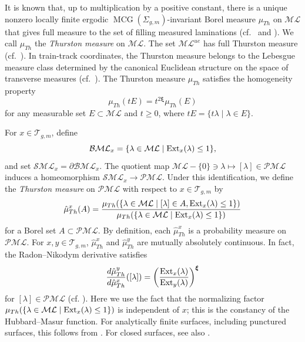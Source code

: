 \documentclass[dvipdfmx]{amsart}
\theoremstyle{remark}
\newcommand{\ext}{{\rm Ext}}
\newcommand{\teich}{\mathcal{T}}
\newcommand{\mcg}{\operatorname{MCG}}
\newcommand{\ThursM}{\mu_{Th}}
\newcommand{\PThursM}{\hat{\mu}_{Th}}
\newcommand{\convgenus}{{\boldsymbol \xi}}
\newcommand{\ml}{\mathcal{ML}}
\newcommand{\pml}{\mathcal{PML}}
\begin{document}
It is known that, up to multiplication by a positive constant, there is a unique nonzero locally finite ergodic $\mcg(\Sigma_{g,m})$-invariant Borel measure $\ThursM$ on $\ml$ that gives full measure to the set of filling measured laminations (cf.\ \cite{Masur1985} and \cite{LindenstraussMirzakhani2008}). We call $\ThursM$ the \emph{Thurston measure} on $\ml$.
The set $\ml^{ue}$ has full Thurston measure (cf.\ \cite{Masur1982}).
In train-track coordinates, the Thurston measure belongs to the Lebesgue measure class determined by the canonical Euclidean structure on the space of transverse measures (cf.\ \cite{MoninTelpukhovskiy2019}). The Thurston measure $\ThursM$ satisfies the homogeneity property
\begin{equation}
\label{eq:homogeneous_Thurston_measure}
\ThursM(tE)=t^{2\convgenus}\ThursM(E)
\end{equation}
for any measurable set $E\subset \ml$ and $t\ge 0$, where $tE=\{t\lambda\mid \lambda\in E\}$.

For $x\in\teich_{g,m}$, define
\[
\mathcal{BML}_x=\{\lambda\in\ml\mid\ext_x(\lambda)\le1\},
\]
and set $\mathcal{SML}_x=\partial\mathcal{BML}_x$.
The quotient map $\ml-\{0\}\ni \lambda\mapsto [\lambda]\in \pml$ induces a homeomorphism $\mathcal{SML}_x\to \pml$.
Under this identification, 
we define the \emph{Thurston measure} on $\pml$ with respect to $x\in \teich_{g,m}$ by
\begin{equation}
\label{eq:def_Th_measure}
\PThursM^x(A)=
\dfrac{\ThursM(\{\lambda\in\ml\mid [\lambda]\in A, \ext_x(\lambda)\le 1\})}{\ThursM(\{\lambda\in\ml\mid \ext_x(\lambda)\le 1\})}
\end{equation}
for a Borel set $A\subset \pml$. By definition, each $\PThursM^x$ is a probability measure on $\pml$. For $x,y\in \teich_{g,m}$, $\PThursM^x$ and $\PThursM^y$ are mutually absolutely continuous. In fact, the Radon--Nikodym derivative satisfies
\begin{equation}
\label{eq:Radon-Nikodym}
\dfrac{d\PThursM^y}{d\PThursM^x}([\lambda])=
\left(\frac{\ext_x(\lambda)}{\ext_y(\lambda)}\right)^{\convgenus}
\end{equation}
for $[\lambda]\in \pml$ (cf. \cite[\S2.3.1]{Mirzakhani_etal2012}). Here we use the fact that the normalizing factor $\ThursM(\{\lambda\in\ml\mid\ext_x(\lambda)\le1\})$ is independent of $x$; this is the constancy of the Hubbard--Masur function. For analytically finite surfaces, including punctured surfaces, this follows from \cite[Corollary 15.2]{Miyachi2023}. For closed surfaces, see also \cite[Theorem 5.10]{Dumas2015}.
\end{document}
